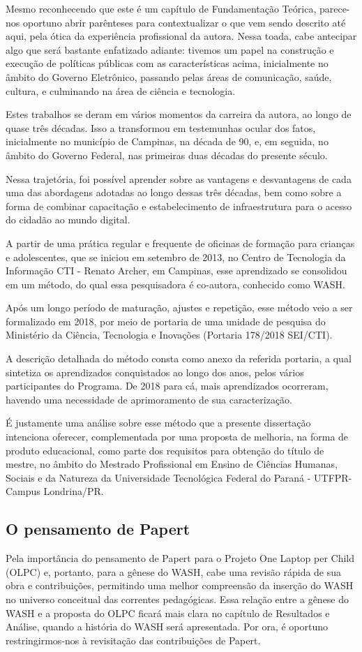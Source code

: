 Mesmo reconhecendo que este é um capítulo de Fundamentação Teórica, parece-nos oportuno abrir parênteses para contextualizar o que vem sendo descrito até aqui, pela ótica da experiência profissional da autora. Nessa toada, cabe antecipar algo que será bastante enfatizado adiante: tivemos um papel na construção e execução de políticas públicas com as características acima, inicialmente no âmbito do Governo Eletrônico, passando pelas áreas de comunicação, saúde, cultura, e culminando na área de ciência e tecnologia.

Estes trabalhos se deram em vários momentos da carreira da autora, ao longo de quase três décadas. Isso a transformou em testemunhas ocular dos fatos, inicialmente no  município de Campinas, na década de 90, e, em seguida, no âmbito do Governo Federal, nas primeiras duas décadas do presente século.

Nessa trajetória, foi possível aprender sobre as vantagens e desvantagens de cada uma das abordagens adotadas ao longo dessas três décadas, bem como sobre a forma de combinar capacitação e estabelecimento de infraestrutura para o acesso do cidadão ao mundo digital.

A partir de uma prática regular e frequente de oficinas de formação para  crianças e adolescentes, que se iniciou em setembro de 2013, no Centro de Tecnologia da Informação CTI - Renato Archer, em Campinas, esse aprendizado se consolidou em um método, do qual essa pesquisadora é co-autora, conhecido como WASH.

Após um longo período de maturação, ajustes e repetição, esse método veio a ser formalizado em 2018, por meio de portaria de uma unidade de pesquisa do Ministério da Ciência, Tecnologia e Inovações (Portaria 178/2018 SEI/CTI).

A descrição detalhada do método consta como anexo da referida portaria, a qual sintetiza os aprendizados conquistados ao longo dos anos, pelos vários participantes do Programa. De 2018 para cá, mais aprendizados ocorreram, havendo uma necessidade de aprimoramento de sua caracterização.

É justamente uma análise sobre esse método que a presente dissertação intenciona oferecer, complementada por uma proposta de melhoria, na forma de produto educacional, como parte dos requisitos para obtenção do título de mestre, no âmbito do Mestrado Profissional em Ensino de Ciências Humanas, Sociais e da Natureza da Universidade  Tecnológica Federal do Paraná - UTFPR- Campus Londrina/PR.

\subsection[O pensamento de Papert]{O pensamento de Papert}\label{O pensamento de Papert}
Pela importância do pensamento de Papert para o Projeto One Laptop per Child (OLPC) e, portanto, para a gênese do WASH, cabe uma revisão rápida de sua obra e contribuições, permitindo uma melhor compreensão da inserção do WASH no universo conceitual das correntes pedagógicas. Essa relação entre a gênese do WASH e a proposta do OLPC ficará mais clara no capítulo de Resultados e Análise, quando a história do WASH será apresentada. Por ora, é oportuno restringirmos-nos à revisitação das contribuições de Papert.

